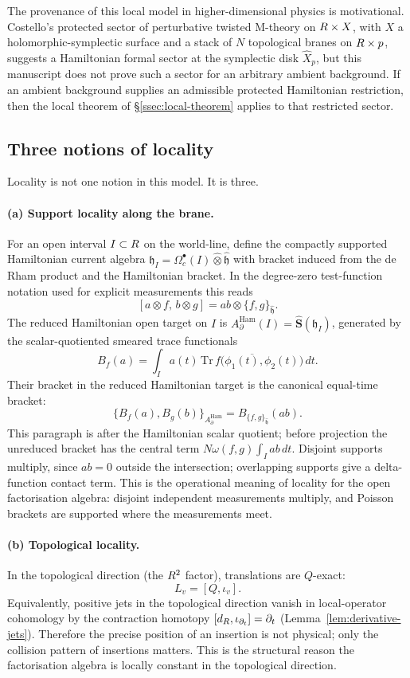 \documentclass[11pt]{memoir}
\begin{document}
The provenance of this local model in higher-dimensional physics is
motivational. Costello's protected sector of perturbative twisted
M-theory on $R\times X$, with $X$ a holomorphic-symplectic surface and
a stack of $N$ topological branes on $R\times p$, suggests a
Hamiltonian formal sector at the symplectic disk $\widehat X_p$, but this
manuscript does not prove such a sector for an arbitrary ambient
background. If an ambient background supplies an admissible protected
Hamiltonian restriction, then the local theorem of
\S\ref{ssec:local-theorem} applies to that restricted sector.

\subsection{Three notions of locality}

Locality is not one notion in this model. It is three.

\paragraph{(a) Support locality along the brane.}
For an open interval $I\subset R$ on the world-line, define the compactly
supported Hamiltonian current algebra
  $\mathfrak h_I=\Omega_c^\bullet(I)\widehat\otimes\widehat{\mathfrak h}$ with
  bracket induced from the de Rham product and the Hamiltonian bracket.
  In the degree-zero test-function notation used for explicit
  measurements this reads
  $$[a\otimes f,\,b\otimes g]=ab\otimes\{f,g\}_{\widehat{\mathfrak h}}.$$
The reduced Hamiltonian open target on $I$ is
$A_\partial^{\mathrm{Ham}}(I)=\widehat{\mathbf S}(\mathfrak h_I)$,
generated by the scalar-quotiented smeared trace functionals
$$B_f(a)=\int_I a(t)\,
  \overline{\mathrm{Tr}\,f\bigl(\phi_1(t),\phi_2(t)\bigr)}\,dt.$$
Their bracket in the reduced Hamiltonian target is the canonical
equal-time bracket:
$$\bigl\{B_f(a),B_g(b)\bigr\}_{A_\partial^{\mathrm{Ham}}}
  =B_{\{f,g\}_{\widehat{\mathfrak h}}}(ab).$$
This paragraph is after the Hamiltonian scalar quotient; before
projection the unreduced bracket has the central term
$N\omega(f,g)\int_I ab\,dt$.
Disjoint supports multiply, since $ab=0$ outside the intersection;
overlapping supports give a delta-function contact term. This is the
operational meaning of locality for the open factorisation algebra:
disjoint independent measurements multiply, and Poisson brackets are
supported where the measurements meet.

\paragraph{(b) Topological locality.}
In the topological direction (the $R^2$ factor), translations are
$Q$-exact:
$$L_v=[Q,\iota_v].$$
Equivalently, positive jets in the topological direction vanish in
local-operator cohomology by the contraction homotopy
$[d_{R},\iota_{\partial_t}]=\partial_t$
(Lemma~\ref{lem:derivative-jets}). Therefore the precise position of an
insertion is not physical; only the collision pattern of insertions matters.
This is the structural reason the factorisation algebra is locally constant
in the topological direction.
\end{document}
